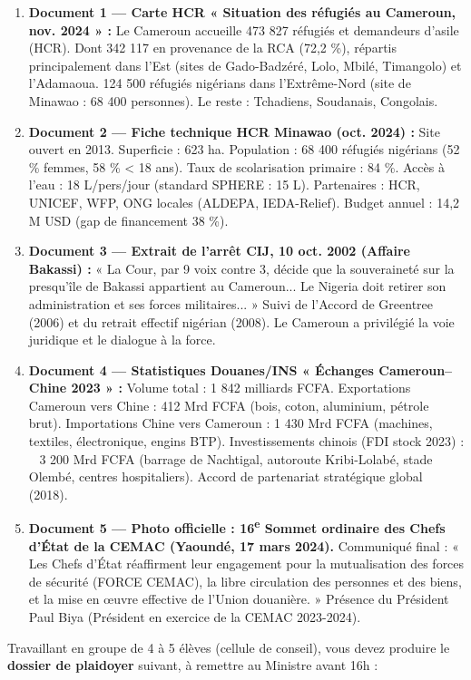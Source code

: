 \documentclass[11pt]{article}
\newcommand{\cle}[1]{{\popxbold\color{popdark}#1}}
\newcounter{popsec}
\newcounter{popsub}
\newcommand{\courssub}[1]{%
  \stepcounter{popsub}%
  \par\vspace{9pt}\noindent{\popxbold\fontsize{11.5}{13}\selectfont\color{popink}{\color{poporange}\thepopsec.\thepopsub}\hspace{6pt}#1}\par\nopagebreak\vspace{4pt}
}
\begin{document}
\begin{enumerate}
    \item \textbf{Document 1 — Carte HCR « Situation des réfugiés au Cameroun, nov. 2024 » :} Le Cameroun accueille 473 827 réfugiés et demandeurs d'asile (HCR). Dont 342 117 en provenance de la RCA (72,2 \%), répartis principalement dans l'Est (sites de Gado-Badzéré, Lolo, Mbilé, Timangolo) et l'Adamaoua. 124 500 réfugiés nigérians dans l'Extrême-Nord (site de Minawao : 68 400 personnes). Le reste : Tchadiens, Soudanais, Congolais.
    \item \textbf{Document 2 — Fiche technique HCR Minawao (oct. 2024) :} Site ouvert en 2013. Superficie : 623 ha. Population : 68 400 réfugiés nigérians (52 \% femmes, 58 \% < 18 ans). Taux de scolarisation primaire : 84 \%. Accès à l'eau : 18 L/pers/jour (standard SPHERE : 15 L). Partenaires : HCR, UNICEF, WFP, ONG locales (ALDEPA, IEDA-Relief). Budget annuel : 14,2 M USD (gap de financement 38 \%).
    \item \textbf{Document 3 — Extrait de l'arrêt CIJ, 10 oct. 2002 (Affaire Bakassi) :} « La Cour, par 9 voix contre 3, décide que la souveraineté sur la presqu'île de Bakassi appartient au Cameroun... Le Nigeria doit retirer son administration et ses forces militaires... » Suivi de l'Accord de Greentree (2006) et du retrait effectif nigérian (2008). Le Cameroun a privilégié la \cle{voie juridique} et le \cle{dialogue} à la force.
    \item \textbf{Document 4 — Statistiques Douanes/INS « Échanges Cameroun–Chine 2023 » :} Volume total : 1 842 milliards FCFA. Exportations Cameroun vers Chine : 412 Mrd FCFA (bois, coton, aluminium, pétrole brut). Importations Chine vers Cameroun : 1 430 Mrd FCFA (machines, textiles, électronique, engins BTP). Investissements chinois (FDI stock 2023) : ~ 3 200 Mrd FCFA (barrage de Nachtigal, autoroute Kribi-Lolabé, stade Olembé, centres hospitaliers). Accord de partenariat stratégique global (2018).
    \item \textbf{Document 5 — Photo officielle : 16\textsuperscript{e} Sommet ordinaire des Chefs d'État de la CEMAC (Yaoundé, 17 mars 2024).} Communiqué final : « Les Chefs d'État réaffirment leur engagement pour la mutualisation des forces de sécurité (FORCE CEMAC), la libre circulation des personnes et des biens, et la mise en œuvre effective de l'Union douanière. » Présence du Président Paul Biya (Président en exercice de la CEMAC 2023-2024).
\end{enumerate}

\courssub{Consignes}
Travaillant en groupe de 4 à 5 élèves (cellule de conseil), vous devez produire le \textbf{dossier de plaidoyer} suivant, à remettre au Ministre avant 16h :
\end{document}
